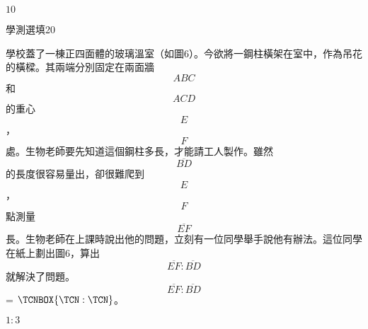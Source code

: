 \begin{QUESTIONS}
\begin{QUESTION}
\begin{QBODY}
        \end{QBODY}
        \begin{QFROMS}
        \end{QFROMS}
        \begin{QTAGS}\end{QTAGS}
        \begin{QANS}
            $10$
        \end{QANS}
        \begin{QSOLLIST}
        \end{QSOLLIST}
        \begin{QEMPTYSPACE}
        \end{QEMPTYSPACE}
    \end{QUESTION}
    \begin{QUESTION}
        \begin{ExamInfo}{85}{學測}{選填}{20}
        \end{ExamInfo}
        \begin{ExamAnsRateInfo}{}{}{}{}
        \end{ExamAnsRateInfo}
        \begin{QBODY}
            學校蓋了一棟正四面體的玻璃溫室（如圖6）。今欲將一鋼柱橫架在室中，作為吊花的橫樑。其兩端分別固定在兩面牆\[ABC\]和\[ACD\]的重心\[E\]，\[F\]處。生物老師要先知道這個鋼柱多長，才能請工人製作。雖然\[\overline{BD}\]的長度很容易量出，卻很難爬到\[E\]，\[F\]點測量\[\overline{EF}\]長。生物老師在上課時說出他的問題，立刻有一位同學舉手說他有辦法。這位同學在紙上劃出圖6，算出\[\overline{EF}:\overline{BD }\]就解決了問題。\[\overline{EF}:\overline{BD }\]= $\TCNBOX{\TCN:\TCN}$。
        \end{QBODY}
        \begin{QFROMS}
        \end{QFROMS}
        \begin{QTAGS}\end{QTAGS}
        \begin{QANS}
            $1:3$
        \end{QANS}
        \begin{QSOLLIST}
        \end{QSOLLIST}
        \begin{QEMPTYSPACE}
        \end{QEMPTYSPACE}
    \end{QUESTION}
\end{QUESTIONS}